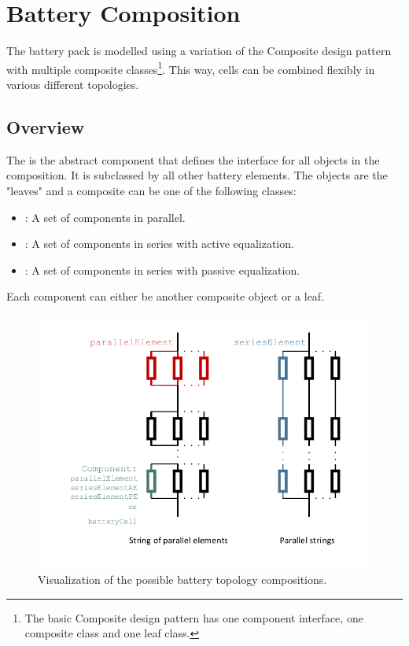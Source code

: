 \section{Battery Composition}
The battery pack is modelled using a variation of the Composite design pattern with multiple composite classes\footnote{The basic Composite design pattern has one component interface, one composite class and one leaf class.}. This way, cells can be combined flexibly in various different topologies.

\subsection{Overview}
The  is the abstract component that defines the interface for all objects in the composition. It is subclassed by all other battery elements. The  objects are the "leaves" and a composite can be one of the following classes:
\begin{itemize}
	\item {}: A set of components in parallel.
	\item {}: A set of components in series with active equalization.
	\item {}: A set of components in series with passive equalization.
\end{itemize}
Each component can either be another composite object or a leaf.
\begin{figure}[b!]
	\captionsetup{type=figure}
	\centering
	\includegraphics[width=\textwidth]{topologies2.pdf}
	\caption[Visualization of the possible battery topology compositions]{Visualization of the possible battery topology compositions.}
	\label{fig:topologies2}
\end{figure}
